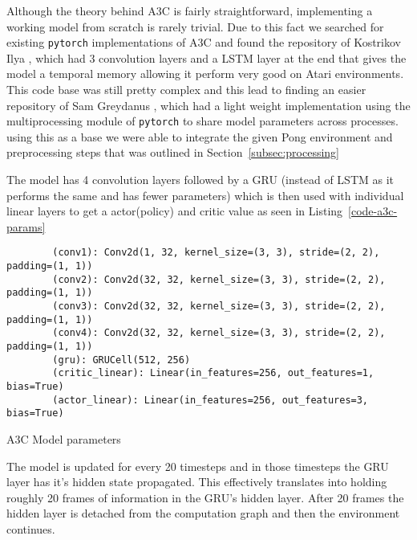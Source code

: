 \bigskip
\noindent
Although the theory behind A3C is fairly straightforward, implementing a working model from scratch is rarely trivial. Due to this fact we searched for existing \texttt{pytorch} implementations of A3C and found the repository of Kostrikov Ilya \cite{orig_a3c}, which had 3 convolution layers and a LSTM layer at the end that gives the model a temporal memory allowing it perform very good on Atari environments. This code base was still pretty complex and this lead to finding an easier repository of Sam Greydanus \cite{baby-a3c}, which had a light weight implementation using the multiprocessing module of \texttt{pytorch} to share model parameters across processes. using this as a base we were able to integrate the given Pong environment and preprocessing steps that was outlined in Section~\ref{subsec:processing}

The model has 4 convolution layers followed by a GRU (instead of LSTM as it performs the same and has fewer parameters) which is then used with individual linear layers to get a actor(policy) and critic value as seen in Listing~\ref{code-a3c-params}

\begin{listing}[ht]
    \begin{verbatim}
        (conv1): Conv2d(1, 32, kernel_size=(3, 3), stride=(2, 2), padding=(1, 1)) 
        (conv2): Conv2d(32, 32, kernel_size=(3, 3), stride=(2, 2), padding=(1, 1))
        (conv3): Conv2d(32, 32, kernel_size=(3, 3), stride=(2, 2), padding=(1, 1))
        (conv4): Conv2d(32, 32, kernel_size=(3, 3), stride=(2, 2), padding=(1, 1))
        (gru): GRUCell(512, 256)
        (critic_linear): Linear(in_features=256, out_features=1, bias=True)       
        (actor_linear): Linear(in_features=256, out_features=3, bias=True)  
      \end{verbatim}
    \caption{A3C Model parameters}
    \label{code-a3c-params}
\end{listing}

The model is updated for every 20 timesteps and in those timesteps the GRU layer has it's hidden state propagated. This effectively translates into holding roughly 20 frames of information in the GRU's hidden layer. After 20 frames the hidden layer is detached from the computation graph and then the environment continues.